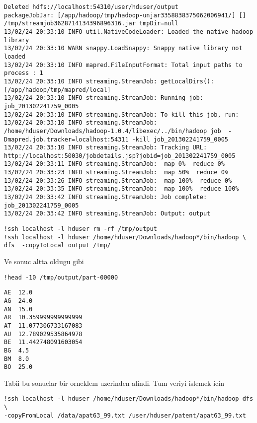 \documentclass[12pt,fleqn]{article}\usepackage{../common}
\begin{document}
\begin{verbatim}
Deleted hdfs://localhost:54310/user/hduser/output
packageJobJar: [/app/hadoop/tmp/hadoop-unjar3358838375062006941/] [] /tmp/streamjob3628714134396896316.jar tmpDir=null
13/02/24 20:33:10 INFO util.NativeCodeLoader: Loaded the native-hadoop library
13/02/24 20:33:10 WARN snappy.LoadSnappy: Snappy native library not loaded
13/02/24 20:33:10 INFO mapred.FileInputFormat: Total input paths to process : 1
13/02/24 20:33:10 INFO streaming.StreamJob: getLocalDirs(): [/app/hadoop/tmp/mapred/local]
13/02/24 20:33:10 INFO streaming.StreamJob: Running job: job_201302241759_0005
13/02/24 20:33:10 INFO streaming.StreamJob: To kill this job, run:
13/02/24 20:33:10 INFO streaming.StreamJob: /home/hduser/Downloads/hadoop-1.0.4/libexec/../bin/hadoop job  -Dmapred.job.tracker=localhost:54311 -kill job_201302241759_0005
13/02/24 20:33:10 INFO streaming.StreamJob: Tracking URL: http://localhost:50030/jobdetails.jsp?jobid=job_201302241759_0005
13/02/24 20:33:11 INFO streaming.StreamJob:  map 0%  reduce 0%
13/02/24 20:33:23 INFO streaming.StreamJob:  map 50%  reduce 0%
13/02/24 20:33:26 INFO streaming.StreamJob:  map 100%  reduce 0%
13/02/24 20:33:35 INFO streaming.StreamJob:  map 100%  reduce 100%
13/02/24 20:33:42 INFO streaming.StreamJob: Job complete: job_201302241759_0005
13/02/24 20:33:42 INFO streaming.StreamJob: Output: output
\end{verbatim}

\begin{verbatim}
!ssh localhost -l hduser rm -rf /tmp/output
!ssh localhost -l hduser /home/hduser/Downloads/hadoop*/bin/hadoop \
dfs  -copyToLocal output /tmp/
\end{verbatim}

Ve sonuc altta oldugu gibi

\begin{verbatim}
!head -10 /tmp/output/part-00000
\end{verbatim}

\begin{verbatim}
AE	12.0
AG	24.0
AN	15.0
AR	10.359999999999999
AT	11.077306733167083
AU	12.789029535864978
BE	11.442748091603054
BG	4.5
BM	8.0
BO	25.0
\end{verbatim}

Tabii bu sonuclar bir orneklem uzerinden alindi. Tum veriyi islemek icin

\begin{verbatim}
!ssh localhost -l hduser /home/hduser/Downloads/hadoop*/bin/hadoop dfs \
-copyFromLocal /data/apat63_99.txt /user/hduser/patent/apat63_99.txt
\end{verbatim}
\end{document}
